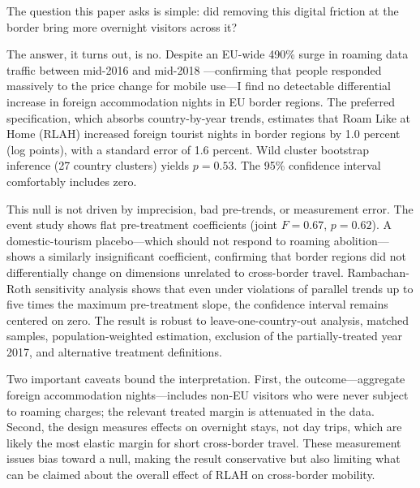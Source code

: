 \documentclass[12pt]{article}
\begin{document}
The question this paper asks is simple: did removing this digital friction at the border bring more overnight visitors across it?

The answer, it turns out, is no. Despite an EU-wide 490\% surge in roaming data traffic between mid-2016 and mid-2018 \citep{berec2018, berec2019}---confirming that people responded massively to the price change for mobile use---I find no detectable differential increase in foreign accommodation nights in EU border regions. The preferred specification, which absorbs country-by-year trends, estimates that Roam Like at Home (RLAH) increased foreign tourist nights in border regions by 1.0 percent (log points), with a standard error of 1.6 percent. Wild cluster bootstrap inference (27 country clusters) yields $p = 0.53$. The 95\% confidence interval comfortably includes zero.

This null is not driven by imprecision, bad pre-trends, or measurement error. The event study shows flat pre-treatment coefficients (joint $F = 0.67$, $p = 0.62$). A domestic-tourism placebo---which should not respond to roaming abolition---shows a similarly insignificant coefficient, confirming that border regions did not differentially change on dimensions unrelated to cross-border travel. Rambachan-Roth sensitivity analysis \citep{rambachan2023} shows that even under violations of parallel trends up to five times the maximum pre-treatment slope, the confidence interval remains centered on zero. The result is robust to leave-one-country-out analysis, matched samples, population-weighted estimation, exclusion of the partially-treated year 2017, and alternative treatment definitions.

Two important caveats bound the interpretation. First, the outcome---aggregate foreign accommodation nights---includes non-EU visitors who were never subject to roaming charges; the relevant treated margin is attenuated in the data. Second, the design measures effects on overnight stays, not day trips, which are likely the most elastic margin for short cross-border travel. These measurement issues bias toward a null, making the result conservative but also limiting what can be claimed about the overall effect of RLAH on cross-border mobility.
\end{document}
